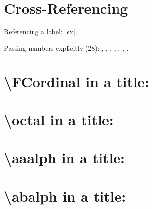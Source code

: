 \documentclass[a4paper]{article}
\newcounter{N}
\begin{document}
\section{Cross-Referencing}

Referencing a label: \ref{ex}.

Passing numbers explicitly (28):
,
,
,
,
,
,
.

\setcounter{N}{777}
\section{\textbackslash FCordinal in a title: }
\section{\textbackslash octal in a title: }
\section{\textbackslash aaalph in a title: }
\section{\textbackslash abalph in a title: }
\end{document}
